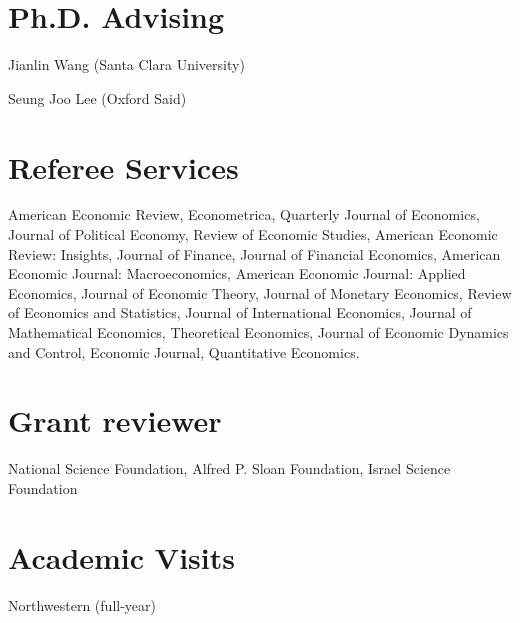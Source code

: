 \documentclass[line]{res}
\newenvironment{list1}{
  \begin{list}{\ding{113}}{%
      \setlength{\itemsep}{0.07in}
      \setlength{\parsep}{0in} \setlength{\parskip}{0in}
		\setlength{\topsep}{0.07in} \setlength{\partopsep}{0in} 
      \setlength{\leftmargin}{0.0in}}}{\end{list}}
\begin{document}
\begin{resume}
\begin{list1}
\end{list1}

\section{\sc Ph.D. Advising}
\begin{list1}
\item[2023] Jianlin Wang (Santa Clara University)

\item[2022] Seung Joo Lee (Oxford Said)

\end{list1}

\section{\sc Referee Services}
\begin{list1}
\item[] American Economic Review, Econometrica, Quarterly Journal of Economics, Journal of Political Economy, Review of Economic Studies, American Economic Review: Insights, Journal of Finance, Journal of Financial Economics, American Economic Journal: Macroeconomics, American Economic Journal: Applied Economics, Journal of Economic Theory, Journal of Monetary Economics, Review of Economics and Statistics, Journal of International Economics, Journal of Mathematical Economics, Theoretical Economics, Journal of Economic Dynamics and Control, Economic Journal, Quantitative Economics.

\end{list1}


\section{\sc Grant reviewer}
\begin{list1}
\item[] National Science Foundation, Alfred P. Sloan Foundation, Israel Science Foundation

\end{list1}

\section{\sc Academic Visits}


\begin{list1}
\item[2023-2024] Northwestern (full-year)


\end{list1}
\end{resume}
\end{document}
